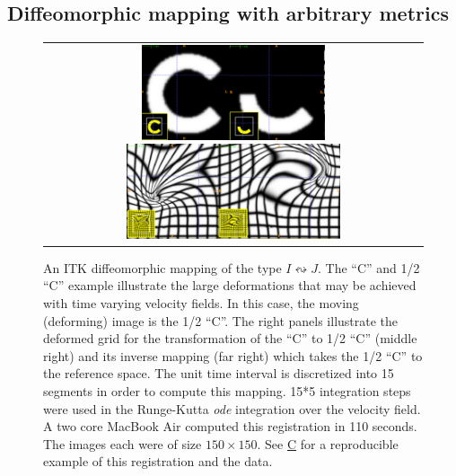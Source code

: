 \documentclass{frontiersSCNS}
\begin{document}
\subsection{Diffeomorphic mapping with arbitrary metrics}
\begin{figure}[t]
\begin{center}
\begin{tabular}{c}
\includegraphics[height=1.1in]{figs/c_chalf.pdf}
\includegraphics[height=1.1in]{figs/c_half_c_grids.pdf}
\end{tabular}
\caption{\baselineskip 12pt \small An ITK diffeomorphic mapping of the
  type $I \leftrightsquigarrow J $.  The 
``C'' and 1/2 ``C'' example illustrate the large deformations that may
be achieved with time varying velocity fields.  In this case, the moving (deforming) image is
the 1/2 ``C''.  The right panels illustrate the deformed grid for the
transformation of the ``C'' to 1/2 ``C'' (middle right) and its
inverse mapping (far right) which takes the 1/2 ``C'' to the reference
space.  The unit time interval is discretized into 15 segments in
order to compute this mapping.  15*5 integration steps were used in
the Runge-Kutta {\em ode} integration over the velocity field.  A two
core MacBook Air computed this registration in 110 seconds.  The images
each were of size $150 \times 150$.  See
\href{http://stnava.github.io/C/}{C} for a reproducible example of
this registration and the data.}
\label{fig:chalf}
\end{center}
\end{figure}
\end{document}
